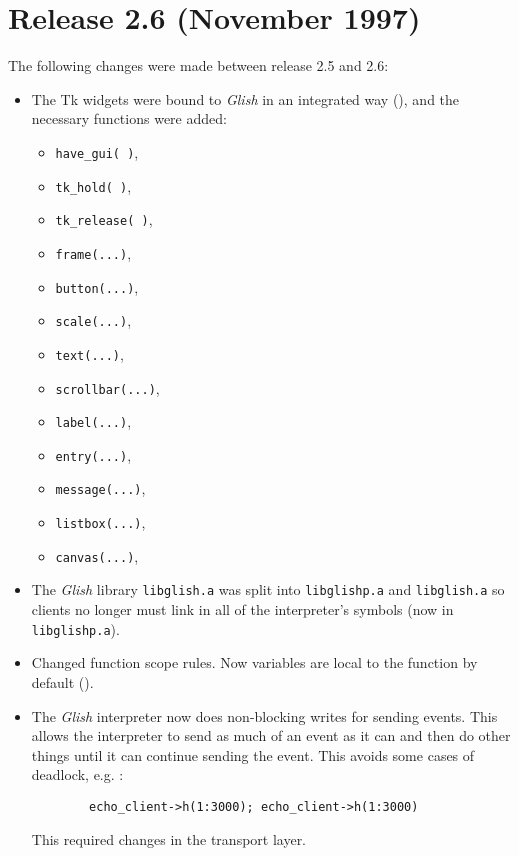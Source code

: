 \section{Release 2.6 (November 1997)}

The following changes were made between release 2.5 and 2.6:

\begin{itemize}

\item The Tk widgets were bound to \emph{Glish} in an integrated way (),
and the necessary functions were added:
\begin{itemize}
\item \texttt{have\_gui( )}, 
\item \texttt{tk\_hold( )}, 
\item \texttt{tk\_release( )}, 
\item \texttt{frame(...)}, 
\item \texttt{button(...)}, 
\item \texttt{scale(...)}, 
\item \texttt{text(...)}, 
\item \texttt{scrollbar(...)}, 
\item \texttt{label(...)}, 
\item \texttt{entry(...)}, 
\item \texttt{message(...)}, 
\item \texttt{listbox(...)}, 
\item \texttt{canvas(...)}, 
\end{itemize}

\item The \emph{Glish} library \texttt{libglish.a} was split into \texttt{libglishp.a} and
\texttt{libglish.a} so clients no longer must link in all of the interpreter's
symbols (now in \texttt{libglishp.a}).

\item Changed function scope rules. Now variables are local to the function
by default ().

\item The \emph{Glish} interpreter now does non-blocking writes for sending
events. This allows the interpreter to send as much of an event as it
can and then do other things until it can continue sending the event.
This avoids some cases of deadlock, e.g. :
\begin{verbatim}
        echo_client->h(1:3000); echo_client->h(1:3000)
\end{verbatim} 
This required changes in the transport layer.


\end{itemize}
